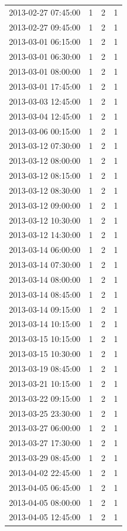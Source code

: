 \begin{tabular}{lrrr}
2013-02-27 07:45:00 & 1 & 2 & 1 \\
2013-02-27 09:45:00 & 1 & 2 & 1 \\
2013-03-01 06:15:00 & 1 & 2 & 1 \\
2013-03-01 06:30:00 & 1 & 2 & 1 \\
2013-03-01 08:00:00 & 1 & 2 & 1 \\
2013-03-01 17:45:00 & 1 & 2 & 1 \\
2013-03-03 12:45:00 & 1 & 2 & 1 \\
2013-03-04 12:45:00 & 1 & 2 & 1 \\
2013-03-06 00:15:00 & 1 & 2 & 1 \\
2013-03-12 07:30:00 & 1 & 2 & 1 \\
2013-03-12 08:00:00 & 1 & 2 & 1 \\
2013-03-12 08:15:00 & 1 & 2 & 1 \\
2013-03-12 08:30:00 & 1 & 2 & 1 \\
2013-03-12 09:00:00 & 1 & 2 & 1 \\
2013-03-12 10:30:00 & 1 & 2 & 1 \\
2013-03-12 14:30:00 & 1 & 2 & 1 \\
2013-03-14 06:00:00 & 1 & 2 & 1 \\
2013-03-14 07:30:00 & 1 & 2 & 1 \\
2013-03-14 08:00:00 & 1 & 2 & 1 \\
2013-03-14 08:45:00 & 1 & 2 & 1 \\
2013-03-14 09:15:00 & 1 & 2 & 1 \\
2013-03-14 10:15:00 & 1 & 2 & 1 \\
2013-03-15 10:15:00 & 1 & 2 & 1 \\
2013-03-15 10:30:00 & 1 & 2 & 1 \\
2013-03-19 08:45:00 & 1 & 2 & 1 \\
2013-03-21 10:15:00 & 1 & 2 & 1 \\
2013-03-22 09:15:00 & 1 & 2 & 1 \\
2013-03-25 23:30:00 & 1 & 2 & 1 \\
2013-03-27 06:00:00 & 1 & 2 & 1 \\
2013-03-27 17:30:00 & 1 & 2 & 1 \\
2013-03-29 08:45:00 & 1 & 2 & 1 \\
2013-04-02 22:45:00 & 1 & 2 & 1 \\
2013-04-05 06:45:00 & 1 & 2 & 1 \\
2013-04-05 08:00:00 & 1 & 2 & 1 \\
2013-04-05 12:45:00 & 1 & 2 & 1 \\

\end{tabular}
